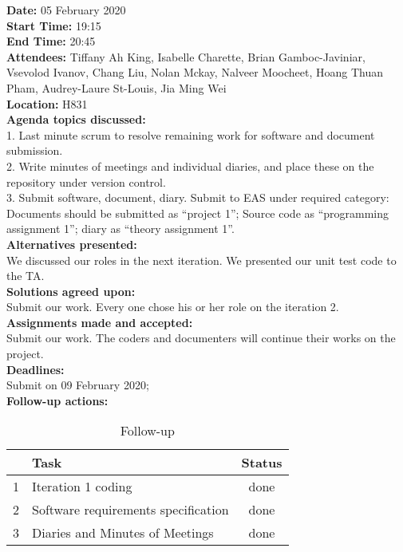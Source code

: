 \documentclass[12pt]{article}
\begin{document}
\newpage
{\bf Date:} 05 February 2020\\
{\bf Start Time:} 19:15\\
{\bf End Time:}  20:45\\
{\bf Attendees:} Tiffany Ah King,
Isabelle Charette,
Brian Gamboc-Javiniar,
Vsevolod Ivanov,
Chang Liu,
Nolan Mckay,
Nalveer Moocheet,
Hoang Thuan Pham,
Audrey-Laure St-Louis,
Jia Ming Wei\\
{\bf Location:} H831 \\
{\bf Agenda topics discussed:} \\1. Last minute scrum to resolve remaining work for software and document submission. 
\\2. Write minutes of meetings and individual diaries, and place these on the repository under version control. 
\\3. Submit software, document, diary. Submit to EAS under required category: Documents should be submitted as “project 1”; Source code as “programming assignment 1”; diary as “theory assignment 1”.\\
{\bf Alternatives presented:} \\We discussed our roles in the next iteration. We presented our unit test code to the TA. \\
{\bf Solutions agreed upon:} \\ Submit our work. Every one chose his or her role on the iteration 2.\\
{\bf Assignments made and accepted:} \\Submit our work. The coders and documenters will continue their works on the project. \\
{\bf Deadlines:} \\Submit on 09 February 2020; \\
{\bf Follow-up actions:} \\
\begin{table}[h!]
\centering
 \begin{tabular}{||l l c ||} 
 \hline
   & Task & Status\\ [0.5ex] 
 \hline\hline
 1 & Iteration 1 coding & done \\ 
 2 & Software requirements specification &  done\\
 3 & Diaries and Minutes of Meetings &  done\\[1ex] 

 \hline
 \end{tabular}
\caption{Follow-up }
\label{table:1}
\end{table}


\end{document}
